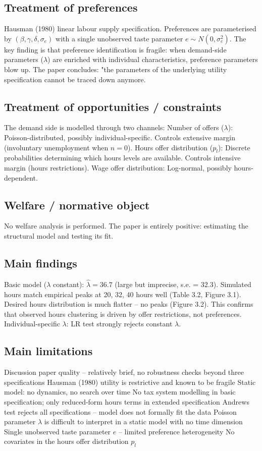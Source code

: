 \documentclass[11pt,a4paper]{article}
\begin{document}
\subsection*{Treatment of preferences}
Hausman (1980) linear labour supply specification. Preferences are parameterised by $(\beta, \gamma, \delta, \sigma_e)$ with a single unobserved taste parameter $e \sim N(0, \sigma_e^2)$. The key finding is that preference identification is fragile: when demand-side parameters ($\lambda$) are enriched with individual characteristics, preference parameters blow up. The paper concludes: "the parameters of the underlying utility specification cannot be traced down anymore.

\subsection*{Treatment of opportunities / constraints}
The demand side is modelled through two channels: Number of offers ($\lambda$): Poisson-distributed, possibly individual-specific. Controls extensive margin (involuntary unemployment when $n = 0$). Hours offer distribution ($p_l$): Discrete probabilities determining which hours levels are available. Controls intensive margin (hours restrictions). Wage offer distribution: Log-normal, possibly hours-dependent.

\subsection*{Welfare / normative object}
No welfare analysis is performed. The paper is entirely positive: estimating the structural model and testing its fit.

\subsection*{Main findings}
Basic model ($\lambda$ constant): $\hat{\lambda} = 36.7$ (large but imprecise, s.e. = 32.3). Simulated hours match empirical peaks at 20, 32, 40 hours well (Table 3.2, Figure 3.1). Desired hours distribution is much flatter -- no peaks (Figure 3.2). This confirms that observed hours clustering is driven by offer restrictions, not preferences. Individual-specific $\lambda$: LR test strongly rejects constant $\lambda$.

\subsection*{Main limitations}
Discussion paper quality -- relatively brief, no robustness checks beyond three specifications Hausman (1980) utility is restrictive and known to be fragile Static model: no dynamics, no search over time No tax system modelling in basic specification; only reduced-form hours terms in extended specification Andrews test rejects all specifications -- model does not formally fit the data Poisson parameter $\lambda$ is difficult to interpret in a static model with no time dimension Single unobserved taste parameter $e$ -- limited preference heterogeneity No covariates in the hours offer distribution $p_l$
\end{document}

